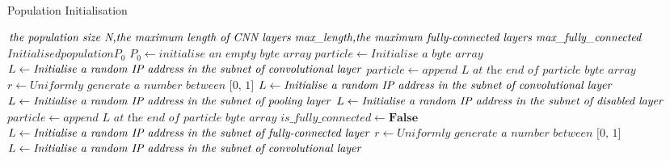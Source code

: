 \documentclass[conference]{IEEEtran}
\begin{document}
\begin{algorithm}
	\caption{Population Initialisation}
	\label{alg:pop_init}
	\begin{algorithmic}
		\renewcommand{\algorithmicrequire}{\textbf{Input:}}
		\renewcommand{\algorithmicensure}{\textbf{Output:}}
		\REQUIRE $\textit{the population size N,} \newline \textit{the maximum length of CNN layers max\_length,} \newline \textit{the maximum fully-connected layers max\_fully\_connected}$
		\ENSURE $Initialised population P_{0}$
		\STATE $P_{0} \leftarrow \textit{initialise an empty byte array}$
			\STATE $particle \leftarrow \textit{Initialise a byte array}$
				\STATE $L \leftarrow \textit{Initialise a random IP address in the subnet of } \newline \textit{convolutional layer}$
				\STATE $particle \leftarrow \textit{append L at the end of particle byte array}$
			\ENDIF
				\STATE $r \leftarrow \textit{Uniformly generate a number between [0, 1]}$
					\STATE $L \leftarrow \textit{Initialise a random IP address } \newline \textit{in the subnet of convolutional layer}$
					\STATE $L \leftarrow \textit{Initialise a random IP address } \newline \textit{in the subnet of pooling layer}$
				\ELSE
					\STATE $L \leftarrow \textit{Initialise a random IP address } \newline \textit{in the subnet of disabled layer}$
				\ENDIF
				\STATE $particle \leftarrow \textit{append L at the end of particle byte array}$
			\ENDWHILE
			\STATE $is\_fully\_connected \leftarrow \textbf{False}$
					\STATE $L \leftarrow \textit{Initialise a random IP address } \newline \textit{in the subnet of fully-connected layer}$
				\ELSE
					\STATE $r \leftarrow \textit{Uniformly generate a number between [0, 1]}$
						\STATE $L \leftarrow \textit{Initialise a random IP address } \newline \textit{in the subnet of convolutional layer}$

\end{algorithmic}
\end{algorithm}
\end{document}
